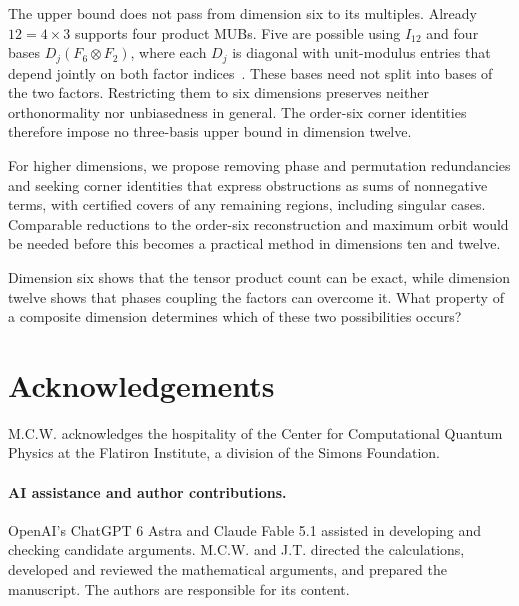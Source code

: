 The upper bound does not pass from dimension six to its multiples. Already $12=4\times3$ supports four product MUBs. Five are possible using $I_{12}$ and four bases $D_j(F_6\otimes F_2)$, where each $D_j$ is diagonal with unit-modulus entries that depend jointly on both factor indices~\cite{wuttig2026mutuallyunbiasedbases}. These bases need not split into bases of the two factors. Restricting them to six dimensions preserves neither orthonormality nor unbiasedness in general. The order-six corner identities therefore impose no three-basis upper bound in dimension twelve.

For higher dimensions, we propose removing phase and permutation redundancies and seeking corner identities that express obstructions as sums of nonnegative terms, with certified covers of any remaining regions, including singular cases. Comparable reductions to the order-six reconstruction and maximum orbit would be needed before this becomes a practical method in dimensions ten and twelve.

Dimension six shows that the tensor product count can be exact, while dimension twelve shows that phases coupling the factors can overcome it. What property of a composite dimension determines which of these two possibilities occurs?

\section*{Acknowledgements}
M.C.W. acknowledges the hospitality of the Center for Computational Quantum Physics at the Flatiron Institute, a division of the Simons Foundation.

\paragraph*{AI assistance and author contributions.}
OpenAI's ChatGPT 6 Astra and Claude Fable 5.1 assisted in developing and checking candidate arguments. M.C.W. and J.T. directed the calculations, developed and reviewed the mathematical arguments, and prepared the manuscript. The authors are responsible for its content.



\clearpage
\onecolumngrid
\appendix
